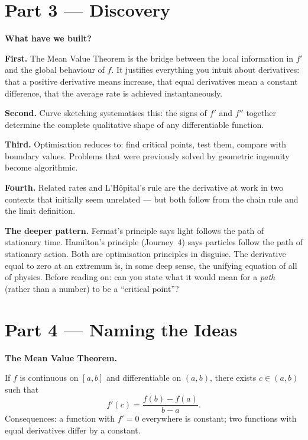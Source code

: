 \documentclass[12pt, a4paper]{article}
\begin{document}
\section{Part 3 \texorpdfstring{---}{--} Discovery}

\begin{discoverybox}
\textbf{What have we built?}

\textbf{First.} The Mean Value Theorem is the bridge between the local information in $f'$ and the global behaviour of $f$. It justifies everything you intuit about derivatives: that a positive derivative means increase, that equal derivatives mean a constant difference, that the average rate is achieved instantaneously.

\textbf{Second.} Curve sketching systematises this: the signs of $f'$ and $f''$ together determine the complete qualitative shape of any differentiable function.

\textbf{Third.} Optimisation reduces to: find critical points, test them, compare with boundary values. Problems that were previously solved by geometric ingenuity become algorithmic.

\textbf{Fourth.} Related rates and L'H\^{o}pital's rule are the derivative at work in two contexts that initially seem unrelated --- but both follow from the chain rule and the limit definition.

\medskip
\textbf{The deeper pattern.} Fermat's principle says light follows the path of stationary time. Hamilton's principle (Journey~4) says particles follow the path of stationary action. Both are optimisation principles in disguise. The derivative equal to zero at an extremum is, in some deep sense, the unifying equation of all of physics. Before reading on: can you state what it would mean for a \emph{path} (rather than a number) to be a ``critical point''?
\end{discoverybox}

\section{Part 4 \texorpdfstring{---}{--} Naming the Ideas}

\begin{namebox}
\textbf{The Mean Value Theorem.}

If $f$ is continuous on $[a,b]$ and differentiable on $(a,b)$, there exists $c\in(a,b)$ such that
\[
  f'(c) = \frac{f(b)-f(a)}{b-a}.
\]
Consequences: a function with $f'=0$ everywhere is constant; two functions with equal derivatives differ by a constant.
\end{namebox}
\end{document}
